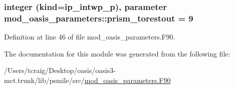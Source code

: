 \hypertarget{classmod__oasis__parameters_a9ed7a0f0a9392248de5b4b15849843df}{
\subsubsection[{prism\+\_\+torestout}]{\setlength{\rightskip}{0pt plus 5cm}integer (kind=ip\+\_\+intwp\+\_\+p), parameter mod\+\_\+oasis\+\_\+parameters\+::prism\+\_\+torestout = 9}}\label{classmod__oasis__parameters_a9ed7a0f0a9392248de5b4b15849843df}


Definition at line 46 of file mod\+\_\+oasis\+\_\+parameters.\+F90.



The documentation for this module was generated from the following file\+:\begin{DoxyCompactItemize}
\item 
/\+Users/tcraig/\+Desktop/oasis/oasis3-\/mct.\+trunk/lib/psmile/src/\hyperlink{mod__oasis__parameters_8_f90}{mod\+\_\+oasis\+\_\+parameters.\+F90}\end{DoxyCompactItemize}
